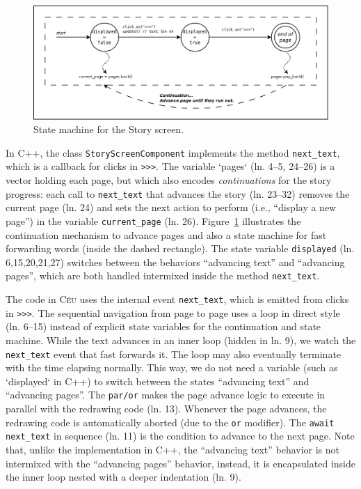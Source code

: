 \documentclass{vgtc}                          %
\newcommand{\CEU}{\textsc{C\'{e}u}\xspace}
\newcommand{\code}[1] {{\small{\texttt{#1}}}}
\begin{document}
\begin{figure}
\centering
\includegraphics[width=\columnwidth]{story}
\caption{State machine for the Story screen.
\label{fig.story}
}
\end{figure}

In C++, the class \code{StoryScreenComponent} implements the method
\code{next\_text}, which is a callback for clicks in \code{>>>}.
%
The variable `pages` (ln. 4--5, 24--26) is a vector holding each page, but
which also encodes \emph{continuations} for the story progress:
each call to \code{next\_text} that advances the story (ln. 23--32) removes the 
current page (ln. 24) and sets the next action to perform (i.e., ``display a
new page'') in the variable \code{current\_page} (ln. 26).
Figure~\ref{fig.story} illustrates the continuation mechanism to advance 
pages and also a state machine for fast forwarding words (inside the dashed
rectangle).
The state variable \code{displayed} (ln. 6,15,20,21,27) switches between the
behaviors ``advancing text'' and ``advancing pages'', which are both handled
intermixed inside the method \code{next\_text}.

The code in \CEU uses the internal event \code{next\_text}, which is emitted
from clicks in \code{>>>}.
%
The sequential navigation from page to page uses a loop in direct style
(ln. 6--15) instead of explicit state variables for the continuation and state
machine.
While the text advances in an inner loop (hidden in ln. 9), we watch the
\code{next\_text} event that fast forwards it.
The loop may also eventually terminate with the time elapsing normally.
This way, we do not need a variable (such as `displayed` in C++) to switch 
between the states ``advancing text'' and ``advancing pages''.
The \code{par/or} makes the page advance logic to execute in parallel with the
redrawing code (ln. 13).
Whenever the page advances, the redrawing code is automatically aborted
(due to the \code{or} modifier).
The \code{await next\_text} in sequence (ln. 11) is the condition to advance to
the next page.
%
Note that, unlike the implementation in C++, the ``advancing text'' behavior is
not intermixed with the ``advancing pages'' behavior, instead, it is
encapsulated inside the inner loop nested with a deeper indentation (ln. 9).



\end{document}
